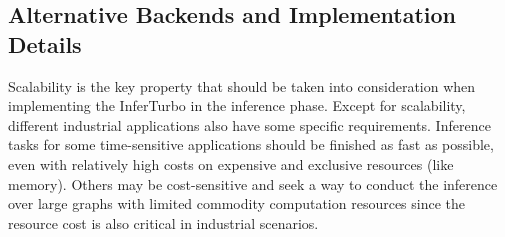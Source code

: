 \documentclass[conference]{IEEEtran}
\begin{document}
%
%
%
%



\subsection{Alternative Backends and Implementation Details}
Scalability is the key property that should be taken into consideration when implementing the InferTurbo in the inference phase.
Except for scalability, different industrial applications also have some specific requirements.
Inference tasks for some time-sensitive applications should be finished as fast as possible, even with relatively high costs on expensive and exclusive resources (like memory).
Others may be cost-sensitive and seek a way to conduct the inference over large graphs with limited commodity computation resources since the resource cost is also critical in industrial scenarios.
\end{document}
